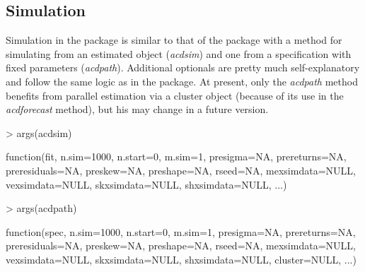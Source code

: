 \subsection{Simulation}
Simulation in the \verb@racd@ package is similar to that of the \verb@rugarch@ package with a method for simulating from an estimated object (\emph{acdsim}) and one from a specification with fixed parameters (\emph{acdpath}). Additional optionals are pretty much self-explanatory and follow the same logic as in the \verb@rugarch@ package. At present, only the \emph{acdpath} method benefits from parallel estimation via a cluster object (because of its use in the \emph{acdforecast} method), but his may change in a future version.
\begin{Schunk}
\begin{Sinput}
> args(acdsim)
\end{Sinput}
\begin{Soutput}
function(fit, n.sim=1000, n.start=0, m.sim=1, presigma=NA,
prereturns=NA, preresiduals=NA, preskew=NA, preshape=NA,
rseed=NA, mexsimdata=NULL, vexsimdata=NULL, skxsimdata=NULL,
shxsimdata=NULL, ...)
\end{Soutput}
\end{Schunk}

\begin{Schunk}
\begin{Sinput}
> args(acdpath)
\end{Sinput}
\begin{Soutput}
function(spec, n.sim=1000, n.start=0, m.sim=1, presigma=NA,
prereturns=NA, preresiduals=NA, preskew=NA, preshape=NA,
rseed=NA, mexsimdata=NULL, vexsimdata=NULL, skxsimdata=NULL,
shxsimdata=NULL, cluster=NULL, ...)
\end{Soutput}
\end{Schunk}
